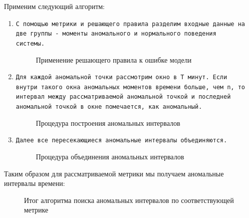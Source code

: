 \documentclass[14pt, a4paper]{extarticle}
\begin{document}
	Применим следующий алгоритм:
	\begin{enumerate}
	 	\item \texttt{С помощью метрики и решающего правила разделим входные данные на две группы - моменты аномального и нормального поведения\\ системы.}
	 	\begin{figure}[H]
		\centerline{} 
		\caption{Применение решающего правила к ошибке модели}
		\label{target_metric_fig1}
	\end{figure} 
	\item \texttt{Для каждой аномальной точки рассмотрим окно в T минут. Если \\внутри такого окна аномальных моментов времени больше, чем n, то интервал между рассматриваемой аномальной точкой и последней аномальной точкой в окне помечается, как аномальный.}
	\begin{figure}[H]
		\centerline{} 
		\caption{Процедура построения аномальных интервалов}
		\label{target_metric_fig1}
	\end{figure} 
	\item \texttt{Далее все пересекающиеся аномальные интервалы объединяются.}	
	\begin{figure}[H]
		\centerline{} 
		\caption{Процедура объединения аномальных интервалов}
		\label{target_metric_fig1}
	\end{figure} 
	\end{enumerate}
	
	Таким образом для рассматриваемой метрики мы получаем аномальные интервалы времени:
	\begin{figure}[H]
		\centerline{} 
		\caption{Итог алгоритма поиска аномальных интервалов по соответствующей метрике}
		\label{target_metric_fig1}
	\end{figure} 
	
\end{document}
